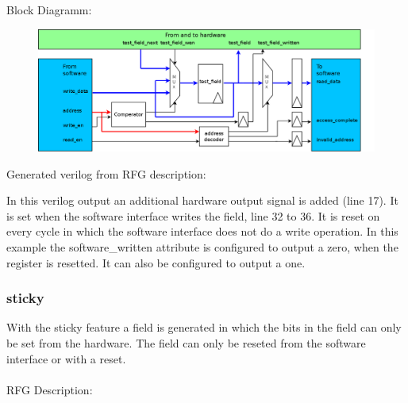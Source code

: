 \documentclass[12pt,a4paper]{article}
\begin{document}
Block Diagramm:
\begin{figure}[h!]
    \includegraphics[width=\textwidth]{pictures/Reg_hrw_srw_swritten.png}
\end{figure}
\newpage
Generated verilog from RFG description:

In this verilog output an additional hardware output signal is added (line 17). It is set when the software interface writes the field, line 32 to 36. It is reset on every cycle in which the software interface does not do a write operation. In this example the software\_written attribute is configured to output a zero, when the register is resetted. It can also be configured to output a one.
\newpage
\subsubsection{sticky}
With the sticky feature a field is generated in which the bits in the field can only be set from the hardware. The field can only be reseted from the software interface or with a reset.\\
\\
RFG Description:

\end{document}

